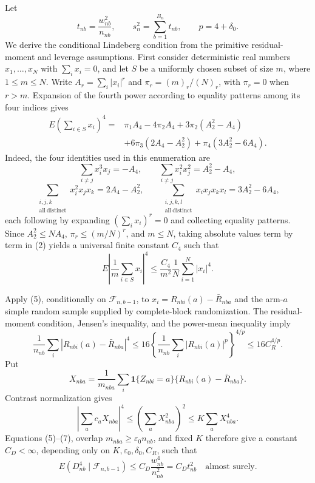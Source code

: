 Let
\[
t_{nb}=\frac{w_{nb}^2}{n_{nb}},\qquad s_n^2=\sum_{b=1}^{B_n}t_{nb},
\qquad p=4+\delta_0.
\tag{1}
\]
We derive the conditional Lindeberg condition from the primitive residual-moment and leverage assumptions. First consider deterministic real numbers \(x_1,\ldots,x_N\) with \(\sum_i x_i=0\), and let \(S\) be a uniformly chosen subset of size \(m\), where \(1\le m\le N\). Write \(A_r=\sum_i|x_i|^r\) and \(\pi_r=(m)_r/(N)_r\), with \(\pi_r=0\) when \(r>m\). Expansion of the fourth power according to equality patterns among its four indices gives
\[
\begin{aligned}
E\left(\sum_{i\in S}x_i\right)^4
={}&\pi_1A_4-4\pi_2A_4+3\pi_2(A_2^2-A_4)\\
&+6\pi_3(2A_4-A_2^2)+\pi_4(3A_2^2-6A_4).
\end{aligned}
\tag{2}
\]
Indeed, the four identities used in this enumeration are
\[
\sum_{i\ne j}x_i^3x_j=-A_4,
\qquad
\sum_{i\ne j}x_i^2x_j^2=A_2^2-A_4,
\tag{3}
\]
\[
\sum_{\substack{i,j,k\\\mathrm{all\ distinct}}}x_i^2x_jx_k
=2A_4-A_2^2,
\qquad
\sum_{\substack{i,j,k,l\\\mathrm{all\ distinct}}}x_ix_jx_kx_l
=3A_2^2-6A_4,
\tag{4}
\]
each following by expanding \((\sum_i x_i)^r=0\) and collecting equality patterns. Since \(A_2^2\le NA_4\), \(\pi_r\le(m/N)^r\), and \(m\le N\), taking absolute values term by term in (2) yields a universal finite constant \(C_4\) such that
\[
E\left|\frac1m\sum_{i\in S}x_i\right|^4
\le\frac{C_4}{m^2}\frac1N\sum_{i=1}^N|x_i|^4.
\tag{5}
\]

Apply (5), conditionally on \(\mathcal F_{n,b-1}\), to
\(x_i=R_{nbi}(a)-\bar R_{nba}\) and the arm-\(a\) simple random sample supplied by complete-block randomization. The residual-moment condition, Jensen's inequality, and the power-mean inequality imply
\[
\frac1{n_{nb}}\sum_i|R_{nbi}(a)-\bar R_{nba}|^4
\le16\left\{\frac1{n_{nb}}\sum_i|R_{nbi}(a)|^p\right\}^{4/p}
\le16C_R^{4/p}.
\tag{6}
\]
Put
\[
X_{nba}=\frac1{m_{nba}}\sum_i\mathbf1\{Z_{nbi}=a\}
\{R_{nbi}(a)-\bar R_{nba}\}.
\]
Contrast normalization gives
\[
\left|\sum_ac_aX_{nba}\right|^4
\le\left(\sum_aX_{nba}^2\right)^2
\le K\sum_aX_{nba}^4.
\tag{7}
\]
Equations (5)--(7), overlap \(m_{nba}\ge\varepsilon_0n_{nb}\), and fixed \(K\) therefore give a constant \(C_D<\infty\), depending only on \(K,\varepsilon_0,\delta_0,C_R\), such that
\[
E(D_{nb}^4\mid\mathcal F_{n,b-1})
\le C_D\frac{w_{nb}^4}{n_{nb}^2}=C_Dt_{nb}^2
\quad\text{almost surely}.
\tag{8}
\]

